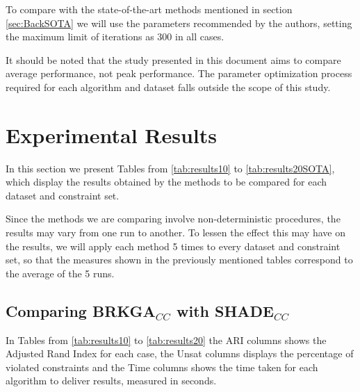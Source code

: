 \documentclass[review]{elsarticle}
\begin{document}
To compare with the state-of-the-art methods mentioned in section \ref{sec:BackSOTA} we will use the parameters recommended by the authors, setting the maximum limit of iterations as 300 in all cases.

It should be noted that the study presented in this document aims to compare average performance, not peak performance. The parameter optimization process required for each algorithm and dataset falls outside the scope of this study.

\section{Experimental Results} \label{sec:results}

In this section we present Tables from \ref{tab:results10} to \ref{tab:results20SOTA}, which display the results obtained by the methods to be compared for each dataset and constraint set.

Since the methods we are comparing involve non-deterministic procedures, the results may vary from one run to another. To lessen the effect this may have on the results, we will apply each method 5 times to every dataset and constraint set, so that the measures shown in the previously mentioned tables correspond to the average of the 5 runs.

\subsection{Comparing BRKGA$_{CC}$ with SHADE$_{CC}$}

In Tables from \ref{tab:results10} to \ref{tab:results20} the ARI columns shows the Adjusted Rand Index for each case, the Unsat columns displays the percentage of violated constraints and the Time columns shows the time taken for each algorithm to deliver results, measured in seconds.
\end{document}
